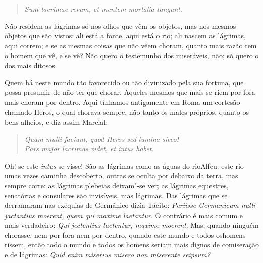 \begin{verse}
\emph{Sunt lacrimae rerum, et mentem mortalia tangunt}.
\end{verse}

Não residem as lágrimas só nos olhos que vêm os objetos, mas nos mesmos
objetos que são vistos: ali está a fonte, aqui está o rio; ali nascem as
lágrimas, aqui correm; e se as mesmas coisas que não vêem choram, quanto
mais razão tem o homem que vê, e se vê? Não quero o testemunho dos
miseráveis, não; só quero o dos mais ditosos.

Quem há neste mundo tão favorecido ou tão divinizado pela sua fortuna,
que possa presumir de não ter que chorar. Aqueles mesmos que mais se
riem por fora mais choram por dentro. Aqui tínhamos antigamente em Roma
um cortesão chamado Heros, o qual chorava sempre, não tanto os males
próprios, quanto os bens alheios, e diz assim Marcial:

\begin{verse}
\emph{Quam multi faciunt, quod Heros sed lumine sicco!}\\
\emph{Pars major lacrimas videt, et intus habet.}
\end{verse}

Oh! se este \emph{intus} se visse! São as lágrimas como as águas do rioAlfeu:
este rio umas vezes caminha descoberto, outras se oculta por debaixo da
terra, mas sempre corre: as lágrimas plebeias deixam"-se ver; as lágrimas
equestres, senatórias e consulares são invisíveis, mas lágrimas. Das
lágrimas que se derramaram nas exéquias de Germânico dizia Tácito:
\emph{Periisse Germanicum nulli jactantius moerent, quem qui maxime
laetantur}. O contrário é mais comum e mais
verdadeiro: \emph{Qui jectentius laetentur, maxime
moerent}. Mas, quando ninguém chorasse, nem por
fora nem por dentro, quando este mundo e todos oshomens rissem, então
todo o mundo e todos os homens seriam mais dignos de comiseração e de
lágrimas: \emph{Quid enim miserius misero non miserente
seipsum?}

